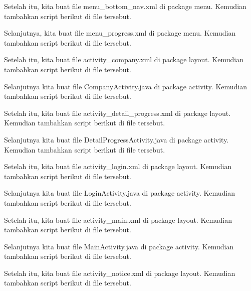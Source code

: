 Setelah itu, kita buat file menu\_bottom\_nav.xml di package menu. Kemudian tambahkan script berikut di file tersebut.


Selanjutnya, kita buat file menu\_progress.xml di package menu. Kemudian tambahkan script berikut di file tersebut.


Setelah itu, kita buat file activity\_company.xml di package layout. Kemudian tambahkan script berikut di file tersebut.


Selanjutnya kita buat file CompanyActivity.java di package activity. Kemudian tambahkan script berikut di file tersebut.


Setelah itu, kita buat file activity\_detail\_progress.xml di package layout. Kemudian tambahkan script berikut di file tersebut.


Selanjutnya kita buat file DetailProgressActivity.java di package activity. Kemudian tambahkan script berikut di file tersebut.

Setelah itu, kita buat file activity\_login.xml di package layout. Kemudian tambahkan script berikut di file tersebut.


Selanjutnya kita buat file LoginActivity.java di package activity. Kemudian tambahkan script berikut di file tersebut.


Setelah itu, kita buat file activity\_main.xml di package layout. Kemudian tambahkan script berikut di file tersebut.


Selanjutnya kita buat file MainActivity.java di package activity. Kemudian tambahkan script berikut di file tersebut.


Setelah itu, kita buat file activity\_notice.xml di package layout. Kemudian tambahkan script berikut di file tersebut.


